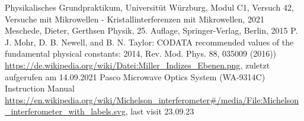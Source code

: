\documentclass[a4paper,10pt,twocolumn]{article}
\begin{document}
    
    \begin{thebibliography}{}    %
         Physikalisches Grundpraktikum, Universitüt Würzburg, Modul C1, Versuch 42, Versuche mit Mikrowellen - Kristallinterferenzen mit Mikrowellen, 2021
         Meschede, Dieter, Gerthsen Physik, 25. Auflage, Springer-Verlag, Berlin, 2015
         P. J. Mohr, D. B. Newell, and B. N. Taylor: \grqq CODATA
        recommended values of the fundamental physical constants: 2014\grqq , Rev. Mod. Phys.
        88, 035009 (2016))
         \url{https://de.wikipedia.org/wiki/Datei:Miller_Indizes_Ebenen.png}, zuletzt aufgerufen am 14.09.2021
         Pasco Microwave Optics System (WA-9314C) Instruction Manual
         \url{https://en.wikipedia.org/wiki/Michelson_interferometer#/media/File:Michelson_interferometer_with_labels.svg}, last visit 23.09.23
    \end{thebibliography}
    
\end{document}
